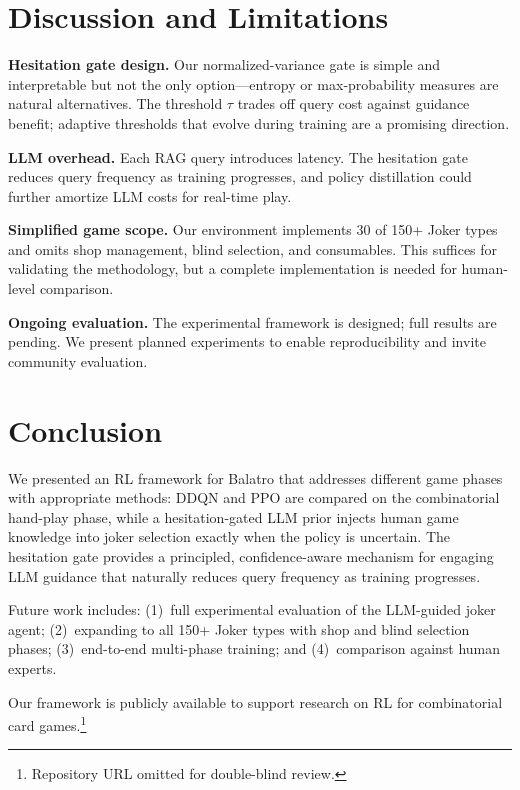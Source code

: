 \documentclass[conference]{IEEEtran}
\begin{document}
\section{Discussion and Limitations}
\label{sec:discussion}

\textbf{Hesitation gate design.} Our normalized-variance gate is simple and interpretable but not the only option---entropy or max-probability measures are natural alternatives. The threshold $\tau$ trades off query cost against guidance benefit; adaptive thresholds that evolve during training are a promising direction.

\textbf{LLM overhead.} Each RAG query introduces latency. The hesitation gate reduces query frequency as training progresses, and policy distillation could further amortize LLM costs for real-time play.

\textbf{Simplified game scope.} Our environment implements 30 of 150+ Joker types and omits shop management, blind selection, and consumables. This suffices for validating the methodology, but a complete implementation is needed for human-level comparison.

\textbf{Ongoing evaluation.} The experimental framework is designed; full results are pending. We present planned experiments to enable reproducibility and invite community evaluation.

\section{Conclusion}
\label{sec:conclusion}

We presented an RL framework for Balatro that addresses different game phases with appropriate methods: DDQN and PPO are compared on the combinatorial hand-play phase, while a hesitation-gated LLM prior injects human game knowledge into joker selection exactly when the policy is uncertain.
The hesitation gate provides a principled, confidence-aware mechanism for engaging LLM guidance that naturally reduces query frequency as training progresses.

Future work includes: (1)~full experimental evaluation of the LLM-guided joker agent; (2)~expanding to all 150+ Joker types with shop and blind selection phases; (3)~end-to-end multi-phase training; and (4)~comparison against human experts.

Our framework is publicly available to support research on RL for combinatorial card games.\footnote{Repository URL omitted for double-blind review.}



\end{document}
